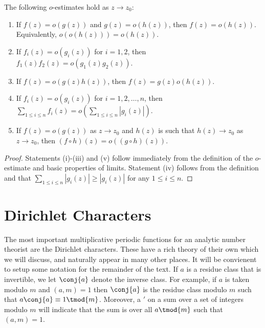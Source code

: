         \begin{proposition}\label{prop:Little_Oh_manipulations}
            The following $o$-estimates hold as $z \to z_{0}$:
            \begin{enumerate}[label=(\roman*)]
              \item If $f(z) = o(g(z))$ and $g(z) = o(h(z))$, then $f(z) = o(h(z))$. Equivalently, $o(o(h(z))) = o(h(z))$.
              \item If $f_{i}(z) = o(g_{i}(z))$ for $i = 1,2$, then $f_{1}(z)f_{2}(z) = o(g_{1}(z)g_{2}(z))$.
              \item If $f(z) = o(g(z)h(z))$, then $f(z) = g(z)o(h(z))$.
              \item If $f_{i}(z) = o(g_{i}(z))$ for $i = 1,2,\ldots,n$, then $\sum_{1 \le i \le n}f_{i}(z) = o\left(\sum_{1 \le i \le n}|g_{i}(z)|\right)$.
              \item If $f(z) = o(g(z))$ as $z \to z_{0}$ and $h(z)$ is such that $h(z) \to z_{0}$ as $z \to z_{0}$, then $(f \circ h)(z) = o((g \circ h)(z))$.
            \end{enumerate}
        \end{proposition}
        \begin{proof}
          Statements (i)-(iii) and (v) follow immediately from the definition of the $o$-estimate and basic properties of limits. Statement (iv) follows from the definition and that $\sum_{1 \le i \le n}|g_{i}(z)| \ge |g_{i}(z)|$ for any $1 \le i \le n$.
        \end{proof}
    \section{Dirichlet Characters}
      The most important multiplicative periodic functions for an analytic number theorist are the Dirichlet characters. These have a rich theory of their own which we will discuss, and naturally appear in many other places. It will be convienent to setup some notation for the remainder of the text. If $a$ is a residue class that is invertible, we let $\conj{a}$ denote the inverse class. For example, if $a$ is taken modulo $m$ and $(a,m) = 1$ then $\conj{a}$ is the residue class modulo $m$ such that $a\conj{a} \equiv 1 \tmod{m}$. Moreover, a $'$ on a sum over a set of integers modulo $m$ will indicate that the sum is over all $a \tmod{m}$ such that $(a,m) = 1$.

